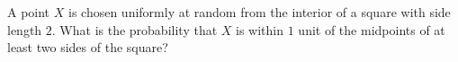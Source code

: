 A point $X$ is chosen uniformly at random from the interior of a square with side length $2$. What is the probability that $X$ is within $1$ unit of the midpoints of at least two sides of the square?

